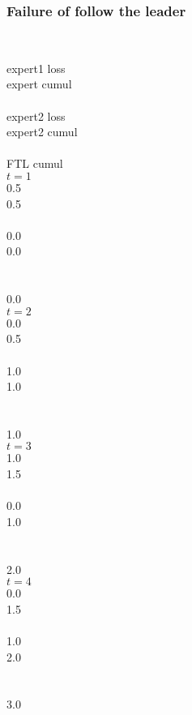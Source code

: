 \documentclass[handout]{beamer}
\begin{document}
\begin{frame}
\frametitle{Failure of follow the leader}
\begin{columns} 
\column[t]{2.5cm}
~ \\ expert1 loss\\ expert cumul\\~\\ expert2 loss\\ expert2 cumul  ~\\
~\\ FTL cumul\\

\column[t]{1cm}
 $t=1$   \\ 0.5\\ 0.5 \\~\\ 0.0  \\ 0.0 \\~\\~\\0.0\\
 		   			   
\column[t]{1cm}	   		   
 $t=2$   \\ 0.0 \\ 0.5 \\~\\ 1.0  \\ 1.0 \\~\\~\\1.0\\

\column[t]{1cm}
 $t=3$ \\ 1.0 \\ 1.5 \\~\\ 0.0 \\ 1.0 \\~\\~\\2.0\\
		    			     
\column[t]{1cm}	   		   
 $t=4$   \\ 0.0 \\ 1.5 \\~\\ 1.0  \\ 2.0 \\~\\~\\3.0\\


\end{columns}
\end{frame}
\end{document}

